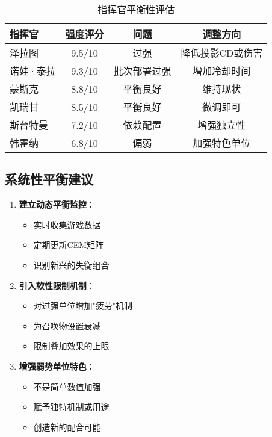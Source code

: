 \documentclass[a4paper,12pt]{article}
\begin{document}
\begin{table}[h]
\centering
\caption{指挥官平衡性评估}
\begin{tabular}{lccc}
\toprule
\textbf{指挥官} & \textbf{强度评分} & \textbf{问题} & \textbf{调整方向} \\
\midrule
泽拉图 & 9.5/10 & 过强 & 降低投影CD或伤害 \\
诺娃·泰拉 & 9.3/10 & 批次部署过强 & 增加冷却时间 \\
蒙斯克 & 8.8/10 & 平衡良好 & 维持现状 \\
凯瑞甘 & 8.5/10 & 平衡良好 & 微调即可 \\
斯台特曼 & 7.2/10 & 依赖配置 & 增强独立性 \\
韩霍纳 & 6.8/10 & 偏弱 & 加强特色单位 \\
\bottomrule
\end{tabular}
\end{table}

\subsection{系统性平衡建议}

\begin{enumerate}
\item \textbf{建立动态平衡监控}：
   \begin{itemize}
   \item 实时收集游戏数据
   \item 定期更新CEM矩阵
   \item 识别新兴的失衡组合
   \end{itemize}

\item \textbf{引入软性限制机制}：
   \begin{itemize}
   \item 对过强单位增加"疲劳"机制
   \item 为召唤物设置衰减
   \item 限制叠加效果的上限
   \end{itemize}

\item \textbf{增强弱势单位特色}：
   \begin{itemize}
   \item 不是简单数值加强
   \item 赋予独特机制或用途
   \item 创造新的配合可能
   \end{itemize}
\end{enumerate}

\end{document}
